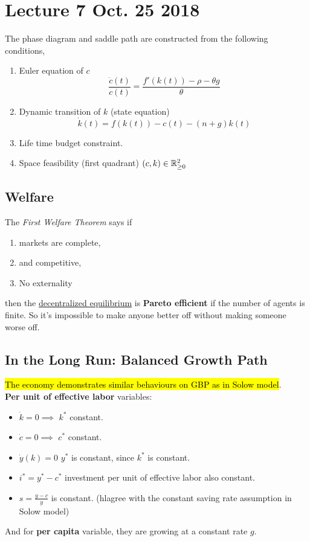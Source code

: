 \documentclass[11pt]{article}
\begin{document}
	\section{Lecture 7 Oct. 25 2018}
		\begin{remark} The phase diagram and saddle path are constructed from the following conditions,
			\begin{enumerate}
				\item Euler equation of $c$ \[ \frac{\dot{c}(t)}{c(t)} = \frac{f'(k(t)) - \rho - \theta g}{\theta} \]
				\item Dynamic transition of $k$ (state equation) \[ \dot{k}(t) = f(k(t)) - c(t) - (n+g)k(t) \]
				\item Life time budget constraint.
				\item Space feasibility (first quadrant) $(c,k) \in \mathbb{R}_{\geq 0}^2$
			\end{enumerate}
		\end{remark}
		
		\subsection{Welfare}
			\par The \emph{First Welfare Theorem} says if 
			\begin{enumerate}
				\item markets are complete,
				\item and competitive,
				\item No externality
			\end{enumerate} then the \ul{decentralized equilibrium} is \textbf{Pareto efficient} if the number of agents is finite. So it's impossible to make anyone better off without making someone worse off.
		
		\subsection{In the Long Run: Balanced Growth Path}
			\par \hl{The economy demonstrates similar behaviours on GBP as in Solow model}. \\
			\textbf{Per unit of effective labor} variables: 
			\begin{itemize}
				\item $\dot{k}=0\implies$ $k^*$ constant.
				\item $\dot{c}=0\implies$ $c^*$ constant.
				\item $\dot{y}(k)=0$ $y^*$ is constant, since $k^*$ is constant.
				\item $i^* = y^* - c^*$ investment per unit of effective labor also constant.
				\item $s = \frac{y-c}{y}$ is constant. (hl{agree with the constant saving rate assumption in Solow model})
			\end{itemize}
			And for \textbf{per capita} variable, they are growing at a constant rate $g$.
			
\end{document}
